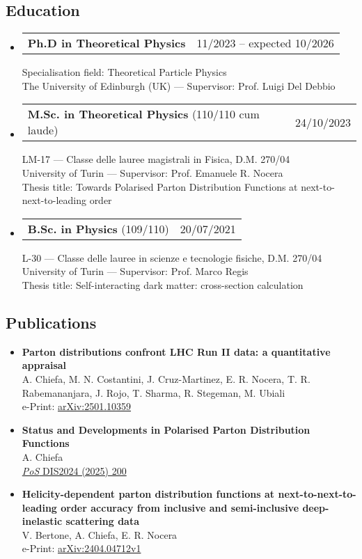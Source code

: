 \documentclass[10pt,a4paper]{article}
\makeatletter
\newcommand{\headerrow}[2]
{\begin{tabular*}{\linewidth}{l@{\extracolsep{\fill}}r}
	#1 &
	#2 \\
\end{tabular*}}
\makeatother
\begin{document}
\subsection*{Education}
\begin{itemize}[leftmargin=1em]
  \item[] 
  \headerrow
		{\textbf{Ph.D in Theoretical Physics}}
    {11/2023 – expected 10/2026}
    Specialisation field: Theoretical Particle Physics\\
    The University of Edinburgh (UK) — Supervisor: Prof. Luigi Del Debbio
  \item[]
  \headerrow
    {\textbf{M.Sc. in Theoretical Physics} (110/110 cum laude)}
    {24/10/2023}
    LM-17 — Classe delle lauree magistrali in Fisica, D.M. 270/04\\
    University of Turin — Supervisor: Prof. Emanuele R. Nocera\\
    Thesis title: Towards Polarised Parton Distribution Functions at next-to-next-to-leading order
  \item[]
  \headerrow
    {\textbf{B.Sc. in Physics} (109/110)}
    {20/07/2021}
    L-30 — Classe delle lauree in scienze e tecnologie fisiche, D.M. 270/04\\
    University of Turin — Supervisor: Prof. Marco Regis\\
    Thesis title: Self-interacting dark matter: cross-section calculation
\end{itemize}

\subsection*{Publications}
\begin{itemize}[leftmargin=1em]
    \item[] 
      \textbf{Parton distributions confront LHC Run II data: a quantitative appraisal} \\
      A. Chiefa, M. N. Costantini, J. Cruz-Martinez, E. R. Nocera, T. R. Rabemananjara, J. Rojo, T. Sharma, R. Stegeman, M. Ubiali \\
      e-Print: \href{https://arxiv.org/abs/2501.10359}{arXiv:2501.10359}
    \item[] 
      \textbf{Status and Developments in Polarised Parton Distribution Functions} \\
      A. Chiefa\\
      \href{https://pos.sissa.it/469/200/pdf}{\textit{PoS} DIS2024 (2025) 200}
    \item[]
      \textbf{Helicity-dependent parton distribution functions at next-to-next-to-leading order accuracy from inclusive and semi-inclusive deep-inelastic scattering data} \\
      V. Bertone, A. Chiefa, E. R. Nocera \\
      e-Print: \href{https://arxiv.org/pdf/2404.04712}{arXiv:2404.04712v1}
\end{itemize}
\end{document}
